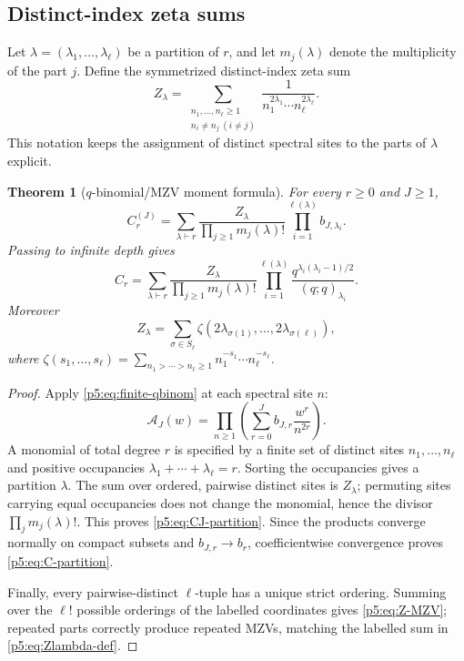 \documentclass[11pt]{article}
\numberwithin{equation}{section}
\newtheorem{theorem}{Theorem}[section]
\theoremstyle{definition}
\theoremstyle{remark}
\begin{document}
\subsection{Distinct-index zeta sums}

Let $\lambda=(\lambda_1,\dots,\lambda_\ell)$ be a partition of $r$, and let
$m_j(\lambda)$ denote the multiplicity of the part $j$.  Define the
symmetrized distinct-index zeta sum
\begin{equation}\label{p5:eq:Zlambda-def}
 Z_\lambda=
 \sum_{\substack{n_1,\dots,n_\ell\ge1\\ n_i\ne n_j\ (i\ne j)}}
 \frac1{n_1^{2\lambda_1}\cdots n_\ell^{2\lambda_\ell}}.
\end{equation}
This notation keeps the assignment of distinct spectral sites to the parts of
$\lambda$ explicit.

\begin{theorem}[$q$-binomial/MZV moment formula]\label{p5:thm:q-mzv}
For every $r\ge0$ and $J\ge1$,
\begin{equation}\label{p5:eq:CJ-partition}
 \boxed{
 C_r^{(J)}=
 \sum_{\lambda\vdash r}
 \frac{Z_\lambda}{\prod_{j\ge1}m_j(\lambda)!}
 \prod_{i=1}^{\ell(\lambda)}b_{J,\lambda_i}.}
\end{equation}
Passing to infinite depth gives
\begin{equation}\label{p5:eq:C-partition}
 \boxed{
 C_r=
 \sum_{\lambda\vdash r}
 \frac{Z_\lambda}{\prod_{j\ge1}m_j(\lambda)!}
 \prod_{i=1}^{\ell(\lambda)}
 \frac{q^{\lambda_i(\lambda_i-1)/2}}{(q;q)_{\lambda_i}}.}
\end{equation}
Moreover
\begin{equation}\label{p5:eq:Z-MZV}
 Z_\lambda=\sum_{\sigma\in S_\ell}
 \zeta(2\lambda_{\sigma(1)},\dots,2\lambda_{\sigma(\ell)}),
\end{equation}
where
$\zeta(s_1,\dots,s_\ell)=\sum_{n_1>\cdots>n_\ell\ge1}
 n_1^{-s_1}\cdots n_\ell^{-s_\ell}$.
\end{theorem}

\begin{proof}
Apply \cref{p5:eq:finite-qbinom} at each spectral site $n$:
\[
 \mathcal A_J(w)=\prod_{n\ge1}
 \left(\sum_{r=0}^{J}b_{J,r}\frac{w^r}{n^{2r}}\right).
\]
A monomial of total degree $r$ is specified by a finite set of distinct sites
$n_1,\dots,n_\ell$ and positive occupancies
$\lambda_1+\cdots+\lambda_\ell=r$.  Sorting the occupancies gives a partition
$\lambda$.  The sum over ordered, pairwise distinct sites is $Z_\lambda$;
permuting sites carrying equal occupancies does not change the monomial, hence
the divisor $\prod_jm_j(\lambda)!$.  This proves
\cref{p5:eq:CJ-partition}.  Since the products converge normally on compact
subsets and $b_{J,r}\to b_r$, coefficientwise convergence proves
\cref{p5:eq:C-partition}.

Finally, every pairwise-distinct $\ell$-tuple has a unique strict ordering.
Summing over the $\ell!$ possible orderings of the labelled coordinates gives
\cref{p5:eq:Z-MZV}; repeated parts correctly produce repeated MZVs, matching the
labelled sum in \cref{p5:eq:Zlambda-def}.
\end{proof}
\end{document}

